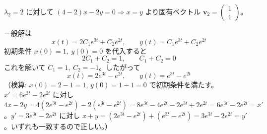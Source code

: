 \documentclass[a4paper,11pt]{article}
\begin{document}
\noindent
$\lambda_{2} = 2$ に対して $(4-2)x - 2y = 0 \Rightarrow x = y$ より固有ベクトル $\mathbf{v}_{2} = \begin{pmatrix} 1 \\ 1 \end{pmatrix}$。

\noindent
一般解は
\[
x(t) = 2C_{1}e^{3t} + C_{2}e^{2t}, \qquad
y(t) = C_{1}e^{3t} + C_{2}e^{2t}
\]
初期条件 $x(0) = 1,\ y(0) = 0$ を代入すると
\[
2C_{1} + C_{2} = 1, \qquad C_{1} + C_{2} = 0
\]
これを解いて $C_{1} = 1,\ C_{2} = -1$。したがって
\[
\boxed{\;
x(t) = 2e^{3t} - e^{2t}, \qquad
y(t) = e^{3t} - e^{2t}
\;}
\]
（検算: $x(0) = 2-1 = 1$, $y(0) = 1-1 = 0$ で初期条件を満たす。$x' = 6e^{3t}-2e^{2t}$ に対し $4x-2y = 4(2e^{3t}-e^{2t})-2(e^{3t}-e^{2t}) = 8e^{3t}-4e^{2t}-2e^{3t}+2e^{2t} = 6e^{3t}-2e^{2t} = x'$。$y' = 3e^{3t}-2e^{2t}$ に対し $x+y = (2e^{3t}-e^{2t})+(e^{3t}-e^{2t}) = 3e^{3t}-2e^{2t} = y'$。いずれも一致するので正しい。）
\end{document}
